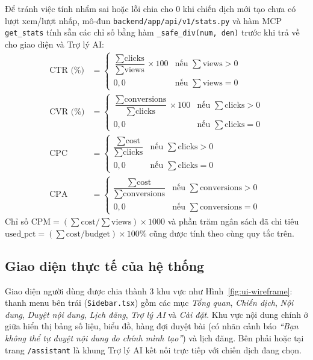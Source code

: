 Để tránh việc tính nhẩm sai hoặc lỗi chia cho 0 khi chiến dịch mới tạo chưa có lượt xem/lượt nhấp, mô-đun \texttt{backend/app/api/v1/stats.py} và hàm MCP \texttt{get\_stats} tính sẵn các chỉ số bằng hàm \texttt{\_safe\_div(num, den)} trước khi trả về cho giao diện và Trợ lý AI:
\begin{align}
\text{CTR (\%)} &= \begin{cases} \dfrac{\sum \text{clicks}}{\sum \text{views}} \times 100 & \text{nếu } \sum \text{views} > 0 \\ 0,0 & \text{nếu } \sum \text{views} = 0 \end{cases} \\
\text{CVR (\%)} &= \begin{cases} \dfrac{\sum \text{conversions}}{\sum \text{clicks}} \times 100 & \text{nếu } \sum \text{clicks} > 0 \\ 0,0 & \text{nếu } \sum \text{clicks} = 0 \end{cases} \\
\text{CPC} &= \begin{cases} \dfrac{\sum \text{cost}}{\sum \text{clicks}} & \text{nếu } \sum \text{clicks} > 0 \\ 0,0 & \text{nếu } \sum \text{clicks} = 0 \end{cases} \\
\text{CPA} &= \begin{cases} \dfrac{\sum \text{cost}}{\sum \text{conversions}} & \text{nếu } \sum \text{conversions} > 0 \\ 0,0 & \text{nếu } \sum \text{conversions} = 0 \end{cases}
\end{align}
Chỉ số $\text{CPM} = (\sum \text{cost} / \sum \text{views}) \times 1000$ và phần trăm ngân sách đã chi tiêu $\text{used\_pct} = (\sum \text{cost} / \text{budget}) \times 100\%$ cũng được tính theo cùng quy tắc trên.

\subsection{Giao diện thực tế của hệ thống}

Giao diện người dùng được chia thành 3 khu vực như Hình~\ref{fig:ui-wireframe}: thanh menu bên trái (\texttt{Sidebar.tsx}) gồm các mục \textit{Tổng quan}, \textit{Chiến dịch}, \textit{Nội dung}, \textit{Duyệt nội dung}, \textit{Lịch đăng}, \textit{Trợ lý AI} và \textit{Cài đặt}. Khu vực nội dung chính ở giữa hiển thị bảng số liệu, biểu đồ, hàng đợi duyệt bài (có nhãn cảnh báo \textit{``Bạn không thể tự duyệt nội dung do chính mình tạo''}) và lịch đăng. Bên phải hoặc tại trang \texttt{/assistant} là khung Trợ lý AI kết nối trực tiếp với chiến dịch đang chọn.


